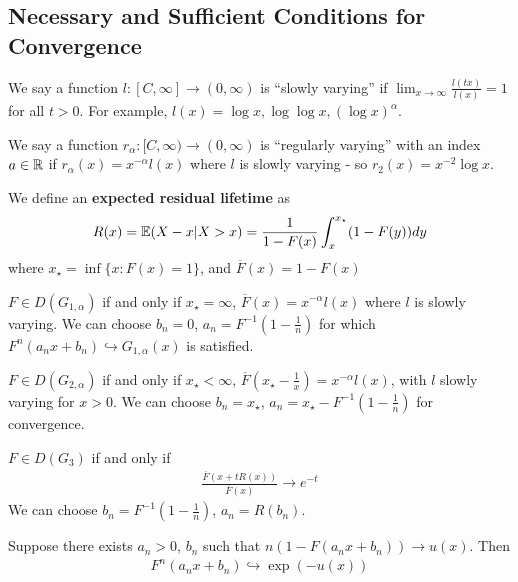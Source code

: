 \subsection{Necessary and Sufficient Conditions for Convergence}
\label{sec:necess-suff-cond}

\begin{defn}
  \label{sec:necess-suff-cond-1}
  We say a function $l: [C, \infty] \rightarrow (0, \infty)$ is ``slowly
varying'' if $\lim_{x \rightarrow \infty} \frac{l(tx)}{l(x)} = 1$ for
all $t > 0$.  For example, $l (x) = \log x, \log \log x, (\log
x)^{\alpha}$.  

We say a function $r_{\alpha}: [C, \infty) \rightarrow (0, \infty)$ is
``regularly varying'' with an index $a \in \mathbb{R}$ if $r_{\alpha}(x) =
x^{-\alpha}l(x)$ where $l$ is slowly varying - so $r_{2}(x) = x^{-2}
\log x$.

We define an \textbf{expected residual lifetime} as
\begin{align}
  \label{eq:120}
  R(x) = \E{X - x | X > x} = \frac{1}{1 - F(x)} \int_{x}^{x_{\star}}
  (1 - F(y)) dy
\end{align} where $x_{\star} = \inf \{ x : F(x) = 1 \}$, and
$\overline F(x) = 1 - F(x)$
\end{defn}

\begin{thm}
  \label{defn:extreme_value_theory:4}
  $F \in D(G_{1, \alpha})$ if and only if $x_{\star} = \infty$,
  $\overline F(x) = x^{-\alpha} l(x)$ where $l$ is slowly varying.  We
  can choose $b_{n} = 0$, $a_{n} = F^{-1}(1 - \frac{1}{n})$ for which
  $F^{n}(a_{n} x + b_{n}) \hookrightarrow G_{1, \alpha}(x)$ is
  satisfied.

  $F \in D(G_{2, \alpha})$ if and only if $x_{\star} < \infty$,
  $\overline F(x_{\star} - \frac{1}{x} ) = x^{-\alpha} l(x)$, with $l$
  slowly varying for $x > 0$.  We can choose $b_{n} = x_{\star}$,
  $a_{n} = x_{\star} - F^{-1}(1 - \frac{1}{n})$ for convergence.

  $F \in D(G_{3})$ if and only if
  \begin{align}
    \label{eq:124}
    \frac{\overline F(x + t R(x))}{\overline F(x)}  \rightarrow e^{-t}
  \end{align} We can choose $b_{n} = F^{-1}(1 - \frac{1}{n})$, $a_{n}
  = R(b_{n})$.
\end{thm}

\begin{lem}[$\star$]
  Suppose there exists $a_{n} > 0$, $b_{n}$ such that $n(1 - F(a_{n}
  x + b_{n})) \rightarrow{ u(x)}$.  Then
  \begin{align}
    \label{eq:125}
    F^{n}(a_{n} x + b_{n}) \hookrightarrow \exp(-u(x))
  \end{align}
\end{lem}





